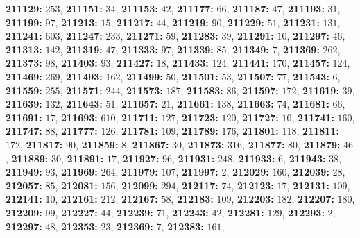 \textsf{\bfseries 211129:} $253$, \textsf{\bfseries 211151:} $34$, \textsf{\bfseries 211153:} $42$, \textsf{\bfseries 211177:} $66$, \textsf{\bfseries 211187:} $47$, \textsf{\bfseries 211193:} $31$, \textsf{\bfseries 211199:} $97$, \textsf{\bfseries 211213:} $15$, \textsf{\bfseries 211217:} $44$, \textsf{\bfseries 211219:} $90$, \textsf{\bfseries 211229:} $51$, \textsf{\bfseries 211231:} $131$, \textsf{\bfseries 211241:} $603$, \textsf{\bfseries 211247:} $233$, \textsf{\bfseries 211271:} $59$, \textsf{\bfseries 211283:} $39$, \textsf{\bfseries 211291:} $10$, \textsf{\bfseries 211297:} $46$, \textsf{\bfseries 211313:} $142$, \textsf{\bfseries 211319:} $47$, \textsf{\bfseries 211333:} $97$, \textsf{\bfseries 211339:} $85$, \textsf{\bfseries 211349:} $7$, \textsf{\bfseries 211369:} $262$, \textsf{\bfseries 211373:} $98$, \textsf{\bfseries 211403:} $93$, \textsf{\bfseries 211427:} $18$, \textsf{\bfseries 211433:} $124$, \textsf{\bfseries 211441:} $170$, \textsf{\bfseries 211457:} $124$, \textsf{\bfseries 211469:} $269$, \textsf{\bfseries 211493:} $162$, \textsf{\bfseries 211499:} $50$, \textsf{\bfseries 211501:} $53$, \textsf{\bfseries 211507:} $77$, \textsf{\bfseries 211543:} $6$, \textsf{\bfseries 211559:} $255$, \textsf{\bfseries 211571:} $244$, \textsf{\bfseries 211573:} $187$, \textsf{\bfseries 211583:} $86$, \textsf{\bfseries 211597:} $172$, \textsf{\bfseries 211619:} $39$, \textsf{\bfseries 211639:} $132$, \textsf{\bfseries 211643:} $51$, \textsf{\bfseries 211657:} $21$, \textsf{\bfseries 211661:} $138$, \textsf{\bfseries 211663:} $74$, \textsf{\bfseries 211681:} $66$, \textsf{\bfseries 211691:} $17$, \textsf{\bfseries 211693:} $610$, \textsf{\bfseries 211711:} $127$, \textsf{\bfseries 211723:} $120$, \textsf{\bfseries 211727:} $10$, \textsf{\bfseries 211741:} $160$, \textsf{\bfseries 211747:} $88$, \textsf{\bfseries 211777:} $126$, \textsf{\bfseries 211781:} $109$, \textsf{\bfseries 211789:} $176$, \textsf{\bfseries 211801:} $118$, \textsf{\bfseries 211811:} $172$, \textsf{\bfseries 211817:} $90$, \textsf{\bfseries 211859:} $8$, \textsf{\bfseries 211867:} $30$, \textsf{\bfseries 211873:} $316$, \textsf{\bfseries 211877:} $80$, \textsf{\bfseries 211879:} $46$, \textsf{\bfseries 211889:} $30$, \textsf{\bfseries 211891:} $17$, \textsf{\bfseries 211927:} $96$, \textsf{\bfseries 211931:} $248$, \textsf{\bfseries 211933:} $6$, \textsf{\bfseries 211943:} $38$, \textsf{\bfseries 211949:} $93$, \textsf{\bfseries 211969:} $264$, \textsf{\bfseries 211979:} $107$, \textsf{\bfseries 211997:} $2$, \textsf{\bfseries 212029:} $160$, \textsf{\bfseries 212039:} $28$, \textsf{\bfseries 212057:} $85$, \textsf{\bfseries 212081:} $156$, \textsf{\bfseries 212099:} $294$, \textsf{\bfseries 212117:} $74$, \textsf{\bfseries 212123:} $17$, \textsf{\bfseries 212131:} $109$, \textsf{\bfseries 212141:} $10$, \textsf{\bfseries 212161:} $212$, \textsf{\bfseries 212167:} $58$, \textsf{\bfseries 212183:} $109$, \textsf{\bfseries 212203:} $182$, \textsf{\bfseries 212207:} $180$, \textsf{\bfseries 212209:} $99$, \textsf{\bfseries 212227:} $44$, \textsf{\bfseries 212239:} $71$, \textsf{\bfseries 212243:} $42$, \textsf{\bfseries 212281:} $129$, \textsf{\bfseries 212293:} $2$, \textsf{\bfseries 212297:} $48$, \textsf{\bfseries 212353:} $23$, \textsf{\bfseries 212369:} $7$, \textsf{\bfseries 212383:} $161$, 
